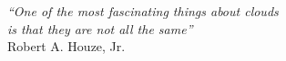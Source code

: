 \begin{dedication}

\textit{``One of the most fascinating things about clouds \\
is that they are not all the same''}\\

 Robert A. Houze, Jr.\\

\end{dedication}
